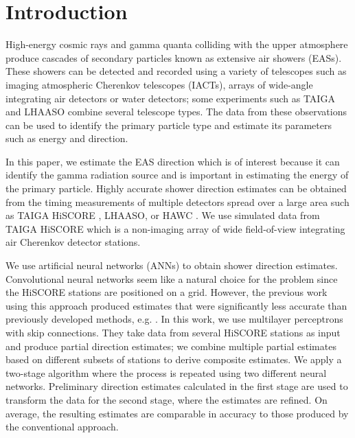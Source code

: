 \documentclass[reprint,
superscriptaddress,
amsmath,amssymb,aps,showkeys,showpacs,
twoside,final,secnumarabic,%
nofootinbib]{revtex4-2}
\makeatletter
\let\svthefootnote\thefootnote
\newcommand\freefootnote[1]{%
  \let\thefootnote\relax%
  \footnotetext{#1}%
  \let\thefootnote\svthefootnote%
}
\renewcommand\onecolumngrid{%
\do@columngrid{one}{\@ne}%
\def\set@footnotewidth{\onecolumngrid}%
\def\footnoterule{\kern-6pt\hrule width 1.5in\kern6pt}%
}
\makeatother
\begin{document}
\maketitle
\thispagestyle{empty}
\onecolumngrid



\section{Introduction}\label{intro}

High-energy cosmic rays and gamma quanta colliding with the upper atmosphere produce cascades of secondary particles known as extensive air showers (EASs). These showers can be detected and recorded using a variety of telescopes such as imaging atmospheric Cherenkov telescopes (IACTs), arrays of wide-angle integrating air detectors or water detectors; some experiments such as TAIGA \cite{Budnev22} and LHAASO \cite{Cao22} combine several telescope types.
The data from these observations can be used to identify the primary particle type and estimate its parameters such as energy and direction. 

In this paper, we estimate the EAS direction which is of interest because it can identify the gamma radiation source and is important in estimating the energy of the primary particle. Highly accurate shower direction estimates can be obtained from the timing measurements of multiple detectors spread over a large area such as TAIGA HiSCORE \cite{Gress17}, LHAASO, or HAWC \cite{Abeysekara23}. We use simulated data from TAIGA HiSCORE which is a non-imaging array of wide field-of-view integrating air Cherenkov detector stations.

We use artificial neural networks (ANNs) to obtain shower direction estimates. Convolutional neural networks seem like a natural choice for the problem since the HiSCORE stations are positioned on a grid. However, the previous work using this approach \cite{Vlaskina22, Kryukov23} produced estimates that were significantly less accurate than previously developed methods, e.g. \cite{Tluczykont21}.
In this work, we use multilayer perceptrons with skip connections. They take data from several HiSCORE stations as input and produce partial direction estimates; we combine multiple partial estimates based on different subsets of stations to derive composite estimates. We apply a two-stage algorithm where the process is repeated using two different neural networks. Preliminary direction estimates calculated in the first stage are used to transform the data for the second stage, where the estimates are refined. On average, the resulting estimates are comparable in accuracy to those produced by the conventional approach.
\end{document}
